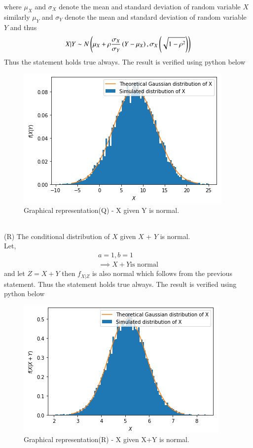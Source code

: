 \documentclass[journal,12pt,twocolumn]{IEEEtran}
\begin{document}
where $\mu_X$ and $\sigma_X$ denote the mean and standard deviation of random variable $X$ similarly $\mu_Y$ and $\sigma_Y$ denote the mean and standard deviation of random variable $Y$ and thus 
\begin{align}
   X|Y \sim N\left(\mu_X+\rho\frac{\sigma_X}{\sigma_Y}\left(Y-\mu_X\right),\sigma_X\left(\sqrt{1-\rho^2}\right)\right) 
\end{align}
 Thus the statement holds true always.
 The result is verified using python below
\begin{figure}[!ht]
\centering
\includegraphics[width=\columnwidth]{X given Y.PNG}
\caption{Graphical representation(Q) - X given Y is normal.}
\label{fig:Graphical Solution}	
\end{figure}
\\
(R) The conditional distribution of $X$ given $X$ + $Y$ is normal.\\
Let,
\begin{align}
a=1, b=1 \\
\implies X+Y \text{is normal}
\end{align}
and let $Z=X+Y$ then $f_{X|Z}$ is also normal which follows from the previous statement.
Thus the statement holds true always.
The result is verified using python below
\begin{figure}[!ht]
\centering
\includegraphics[width=\columnwidth]{X given X+Y.PNG}
\caption{Graphical representation(R) - X given X+Y is normal.}
\label{fig:Graphical Solution}	
\end{figure}
\end{document}
